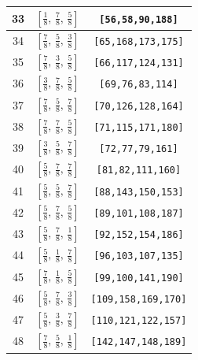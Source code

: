 \documentclass[fleqn,8pt]{jsarticle}
\begin{document}
\begin{longtable}{ccc}
33 & $\left[ \frac{1}{8},\, \frac{7}{8},\, \frac{5}{8} \right]$ & {\tt [56,58,90,188]} \\ \hline
34 & $\left[ \frac{7}{8},\, \frac{5}{8},\, \frac{3}{8} \right]$ & {\tt [65,168,173,175]} \\ \hline
35 & $\left[ \frac{7}{8},\, \frac{3}{8},\, \frac{5}{8} \right]$ & {\tt [66,117,124,131]} \\ \hline
36 & $\left[ \frac{3}{8},\, \frac{7}{8},\, \frac{5}{8} \right]$ & {\tt [69,76,83,114]} \\ \hline
37 & $\left[ \frac{7}{8},\, \frac{5}{8},\, \frac{7}{8} \right]$ & {\tt [70,126,128,164]} \\ \hline
38 & $\left[ \frac{7}{8},\, \frac{7}{8},\, \frac{5}{8} \right]$ & {\tt [71,115,171,180]} \\ \hline
39 & $\left[ \frac{3}{8},\, \frac{5}{8},\, \frac{7}{8} \right]$ & {\tt [72,77,79,161]} \\ \hline
40 & $\left[ \frac{5}{8},\, \frac{7}{8},\, \frac{7}{8} \right]$ & {\tt [81,82,111,160]} \\ \hline
41 & $\left[ \frac{5}{8},\, \frac{5}{8},\, \frac{7}{8} \right]$ & {\tt [88,143,150,153]} \\ \hline
42 & $\left[ \frac{5}{8},\, \frac{7}{8},\, \frac{5}{8} \right]$ & {\tt [89,101,108,187]} \\ \hline
43 & $\left[ \frac{5}{8},\, \frac{7}{8},\, \frac{1}{8} \right]$ & {\tt [92,152,154,186]} \\ \hline
44 & $\left[ \frac{5}{8},\, \frac{1}{8},\, \frac{7}{8} \right]$ & {\tt [96,103,107,135]} \\ \hline
45 & $\left[ \frac{7}{8},\, \frac{1}{8},\, \frac{5}{8} \right]$ & {\tt [99,100,141,190]} \\ \hline
46 & $\left[ \frac{5}{8},\, \frac{7}{8},\, \frac{3}{8} \right]$ & {\tt [109,158,169,170]} \\ \hline
47 & $\left[ \frac{5}{8},\, \frac{3}{8},\, \frac{7}{8} \right]$ & {\tt [110,121,122,157]} \\ \hline
48 & $\left[ \frac{7}{8},\, \frac{5}{8},\, \frac{1}{8} \right]$ & {\tt [142,147,148,189]} \\
\end{longtable}
\renewcommand{\arraystretch}{1.2}
\end{document}
